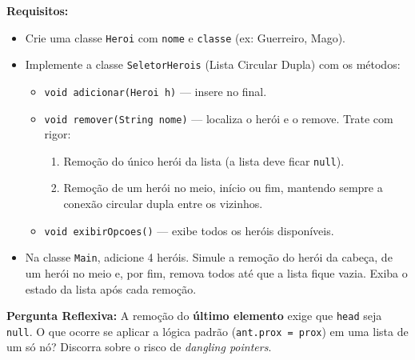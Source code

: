 \documentclass[12pt, a4paper]{article}
\begin{document}
\textbf{Requisitos:}
\begin{itemize}
    \item Crie uma classe \texttt{Heroi} com \texttt{nome} e \texttt{classe} (ex: Guerreiro, Mago).
    \item Implemente a classe \texttt{SeletorHerois} (Lista Circular Dupla) com os métodos:
    \begin{itemize}
        \item \texttt{void adicionar(Heroi h)} — insere no final.
        \item \texttt{void remover(String nome)} — localiza o herói e o remove. Trate com rigor:
        \begin{enumerate}
            \item Remoção do único herói da lista (a lista deve ficar \texttt{null}).
            \item Remoção de um herói no meio, início ou fim, mantendo sempre a conexão circular dupla entre os vizinhos.
        \end{enumerate}
        \item \texttt{void exibirOpcoes()} — exibe todos os heróis disponíveis.
    \end{itemize}
    \item Na classe \texttt{Main}, adicione 4 heróis. Simule a remoção do herói da cabeça, de um herói no meio e, por fim, remova todos até que a lista fique vazia. Exiba o estado da lista após cada remoção.
\end{itemize}

\textbf{Pergunta Reflexiva:} A remoção do \textbf{último elemento} exige que \texttt{head} seja \texttt{null}. O que ocorre se aplicar a lógica padrão (\texttt{ant.prox = prox}) em uma lista de um só nó? Discorra sobre o risco de \textit{dangling pointers}.
\end{document}

